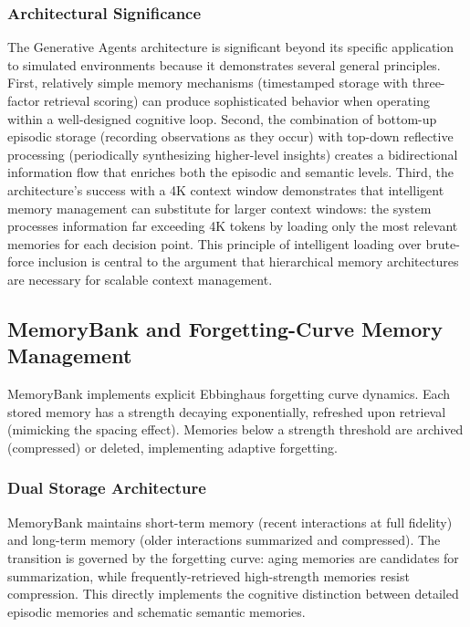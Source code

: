\documentclass[11pt,letterpaper]{article}
\begin{document}
\subsubsection{Architectural Significance}

The Generative Agents architecture is significant beyond its specific application to simulated environments because it demonstrates several general principles. First, relatively simple memory mechanisms (timestamped storage with three-factor retrieval scoring) can produce sophisticated behavior when operating within a well-designed cognitive loop. Second, the combination of bottom-up episodic storage (recording observations as they occur) with top-down reflective processing (periodically synthesizing higher-level insights) creates a bidirectional information flow that enriches both the episodic and semantic levels. Third, the architecture's success with a 4K context window demonstrates that intelligent memory management can substitute for larger context windows: the system processes information far exceeding 4K tokens by loading only the most relevant memories for each decision point. This principle of intelligent loading over brute-force inclusion is central to the argument that hierarchical memory architectures are necessary for scalable context management.

\subsection{MemoryBank and Forgetting-Curve Memory Management}

MemoryBank \cite{zhong2024memorybank} implements explicit Ebbinghaus forgetting curve dynamics. Each stored memory has a strength decaying exponentially, refreshed upon retrieval (mimicking the spacing effect). Memories below a strength threshold are archived (compressed) or deleted, implementing adaptive forgetting.

\subsubsection{Dual Storage Architecture}

MemoryBank maintains short-term memory (recent interactions at full fidelity) and long-term memory (older interactions summarized and compressed). The transition is governed by the forgetting curve: aging memories are candidates for summarization, while frequently-retrieved high-strength memories resist compression. This directly implements the cognitive distinction between detailed episodic memories and schematic semantic memories.
\end{document}
